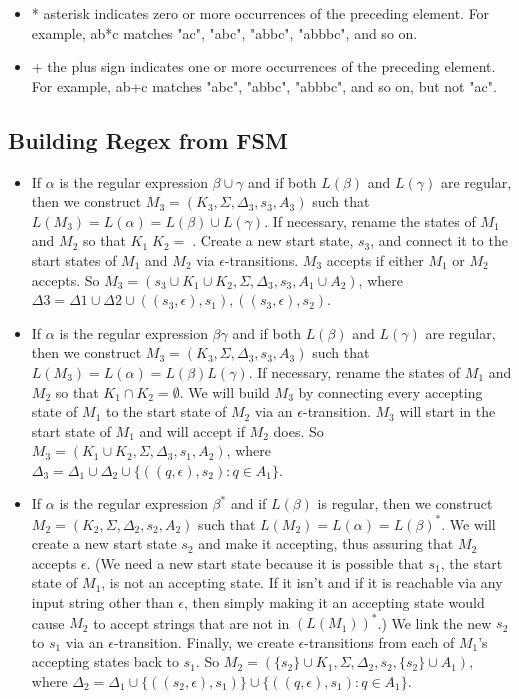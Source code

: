 \documentclass{article}
\begin{document}
\begin{itemize}
		\item * asterisk indicates zero or more occurrences of the preceding element.
		For example, ab*c matches "ac", "abc", "abbc", "abbbc", and so on. 

		\item + the plus sign indicates one or more occurrences of the preceding element.
		For example, ab+c matches "abc", "abbc", "abbbc", and so on, but not "ac". 
\end{itemize}


\subsection{Building Regex from FSM}


\begin{itemize}

\item If $\alpha$ is the regular expression $\beta \cup \gamma$ and if both $L(\beta)$ and $L(\gamma)$ are regular,
then we construct $M_3 = (K_3, \Sigma, \Delta_3, s_3, A_3)$ such that $L(M_3) = L(\alpha) = L(\beta) \cup L(\gamma)$. If necessary, rename the states of $M_1$ and $M_2$ so that $K_1  K_2 = $. Create
a new start state, $s_3$, and connect it to the start states of $M_1$ and $M_2$ via
$\epsilon$-transitions. $M_3$ accepts if either $M_1$ or $M_2$ accepts. So $M_3 = ({s_3} \cup K_1 \cup K_2, \Sigma, \Delta_3, s_3, A_1 \cup A_2)$, where $\Delta3 = \Delta1 \cup \Delta2 \cup {((s_3, \epsilon), s_1), ((s_3, \epsilon), s_2)}$.

\item If $\alpha$ is the regular expression $\beta\gamma$ and if both $L(\beta)$ and $L(\gamma)$ are regular, then
we construct $M_3 = (K_3, \Sigma, \Delta_3, s_3, A_3)$ such that $L(M_3) = L(\alpha) = L(\beta) L(\gamma)$. If
necessary, rename the states of $M_1$ and $M_2$ so that $K_1 \cap K_2 = \emptyset$. We will build $M_3$
by connecting every accepting state of $M_1$ to the start state of $M_2$ via an
$\epsilon$-transition. $M_3$ will start in the start state of $M_1$ and will accept if $M_2$
does. So $M_3 = (K_1 \cup K_2, \Sigma, \Delta_3, s_1, A_2)$, where $\Delta_3 = \Delta_1 \cup \Delta_2 \cup \{((q, \epsilon), s_2) : q
\in A_1\}$.

\item If $\alpha$ is the regular expression $\beta^*$ and if $L(\beta)$ is regular, then we construct
$M_2 = (K_2, \Sigma, \Delta_2, s_2, A_2)$ such that $L(M_2) = L(\alpha) = L(\beta)^*$. We will create a new
start state $s_2$ and make it accepting, thus assuring that $M_2$ accepts $\epsilon$. (We need
a new start state because it is possible that $s_1$, the start state of $M_1$, is not
an accepting state. If it isn't and if it is reachable via any input string
other than $\epsilon$, then simply making it an accepting state would cause $M_2$ to accept
strings that are not in $(L(M_1))^*$.) We link the new $s_2$ to $s_1$ via an
$\epsilon$-transition. Finally, we create $\epsilon$-transitions from each of $M_1$’s accepting
states back to $s_1$. So $M_2 = (\{s_2\} \cup K_1, \Sigma, \Delta_2, s_2, \{s_2\} \cup A_1)$, where $\Delta_2 = \Delta_1 \cup
\{((s_2, \epsilon), s_1)\} \cup \{((q, \epsilon), s_1) : q \in A_1\}$. 


\end{itemize}
\end{document}
